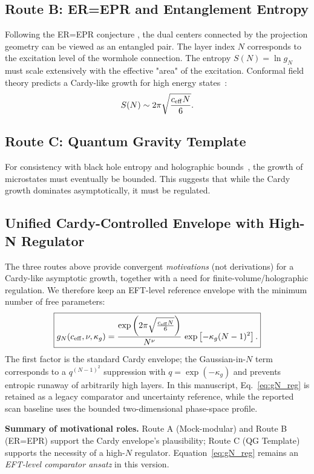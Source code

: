 \documentclass[aps,prd,onecolumn,notitlepage,nofootinbib,superscriptaddress,11pt,floatfix]{revtex4-2}
\begin{document}
\subsection{Route B: ER=EPR and Entanglement Entropy}
Following the ER=EPR conjecture \cite{MaldacenaSusskind2013}, the dual centers connected by the projection geometry can be viewed as an entangled pair. The layer index $N$ corresponds to the excitation level of the wormhole connection. The entropy $S(N) = \ln g_N$ must scale extensively with the effective "area" of the excitation. Conformal field theory predicts a Cardy-like growth for high energy states~\cite{Cardy1986}:
\begin{equation}
S(N) \sim 2\pi \sqrt{\frac{c_{\rm eff} N}{6}}.
\end{equation}

\subsection{Route C: Quantum Gravity Template}
For consistency with black hole entropy and holographic bounds~\cite{Bekenstein1973,tHooft1993}, the growth of microstates must eventually be bounded. This suggests that while the Cardy growth dominates asymptotically, it must be regulated.

\subsection{Unified Cardy-Controlled Envelope with High-N Regulator}
The three routes above provide convergent \emph{motivations} (not derivations) for a Cardy-like asymptotic growth, together with a need for finite-volume/holographic regulation. We therefore keep an EFT-level reference envelope with the minimum number of free parameters:
\begin{equation}
\boxed{
g_N(c_{\rm eff}, \nu, \kappa_g) = \frac{\exp\left( 2\pi \sqrt{\frac{c_{\rm eff} N}{6}} \right)}{N^\nu}\,\exp\left[-\kappa_g (N-1)^2\right].
}
\label{eq:gN_reg}
\end{equation}
The first factor is the standard Cardy envelope; the Gaussian-in-$N$ term corresponds to a $q^{(N-1)^2}$ suppression with $q=\exp(-\kappa_g)$ and prevents entropic runaway of arbitrarily high layers. In this manuscript, Eq.~\eqref{eq:gN_reg} is retained as a legacy comparator and uncertainty reference, while the reported scan baseline uses the bounded two-dimensional phase-space profile.

\textbf{Summary of motivational roles.} Route A (Mock-modular) and Route B (ER=EPR) support the Cardy envelope's plausibility; Route C (QG Template) supports the necessity of a high-$N$ regulator. Equation~\eqref{eq:gN_reg} remains an \emph{EFT-level comparator ansatz} in this version.
\end{document}
